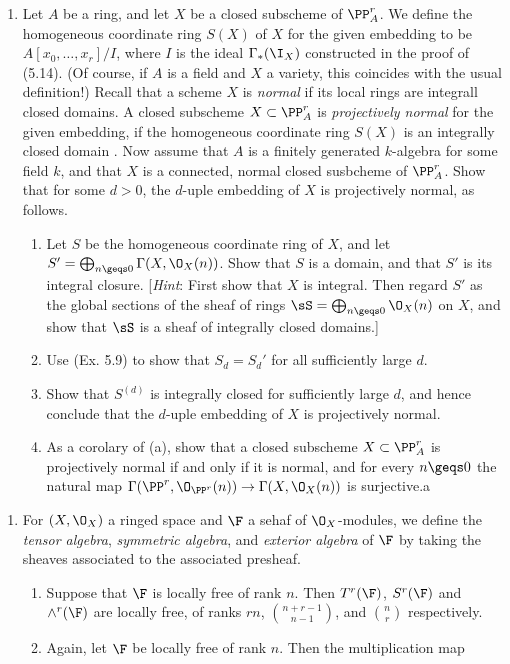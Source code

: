 \documentclass[12pt]{amsart}
\begin{document}
\begin{enumerate}
  \item[5.14.] {
      Let $A$ be a ring, and let $X$ be a closed subscheme of $\PP_A^r$.
      We define the homogeneous coordinate ring $S(X)$ of $X$ for the given embedding to be $A[x_0,\ldots, x_r]/I$, where $I$ is the ideal $\Gamma_*(\I_X)$ constructed in the proof of (5.14).
      (Of course, if $A$ is a field and $X$ a variety, this coincides with the usual definition!)
      Recall that a scheme $X$ is \emph{normal} if its local rings are integrall closed domains.
      A closed subscheme $X\subset \PP_A^r$ is \emph{projectively normal} for the given embedding, if the homogeneous coordinate ring $S(X)$ is an integrally closed domain .
      Now assume that $A$ is a finitely generated $k$-algebra for some field $k$, and that $X$ is a connected, normal closed susbcheme of $\PP_A^r$.
      Show that for some $d>0$, the $d$-uple embedding of $X$ is projectively normal, as follows.
      \begin{enumerate}
        \item Let $S$ be the homogeneous coordinate ring of $X$, and let $S'=\bigoplus_{n\geqs 0}\Gamma(X,\O_X(n))$.
          Show that $S$ is a domain, and that $S'$ is its integral closure.
          [\emph{Hint}: First show that $X$ is integral.
          Then regard $S'$ as the global sections of the sheaf of rings $\sS=\bigoplus_{n\geqs 0}\O_X(n)$ on $X$, and show that $\sS$ is a sheaf of integrally closed domains.]
        \item Use (Ex. 5.9) to show that $S_d=S_d'$ for all sufficiently large $d$.
        \item Show that $S^{(d)}$ is integrally closed for sufficiently large $d$, and hence conclude that the $d$-uple embedding of $X$ is projectively normal.
        \item As a corolary of (a), show that a closed subscheme $X\subset \PP_A^r$ is projectively normal if and only if it is normal, and for every $n\geqs 0$ the natural map $\Gamma(\PP^r,\O_{\PP^r}(n))\to \Gamma(X,\O_X(n))$ is surjective.a
      \end{enumerate}
    }
\end{enumerate}


\begin{enumerate}
  \item[5.16.] {
      For $(X,\O_X)$ a ringed space and $\F$ a sehaf of $\O_X$-modules, we define the \emph{tensor algebra}, \emph{symmetric algebra}, and \emph{exterior algebra} of $\F$ by taking the sheaves associated to the associated presheaf.
      \begin{enumerate}
        \item Suppose that $\F$ is locally free of rank $n$.
           Then $T^r(\F)$, $S^r(\F)$ and $\wedge^r(\F)$ are locally free, of ranks $rn$, $\binom{n+r-1}{n-1}$, and $\binom nr$ respectively.
         \item Again, let $\F$ be locally free of rank $n$.
           Then the multiplication map 
      \end{enumerate}
    }
\end{enumerate}
\end{document}
